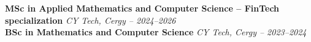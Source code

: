 \textbf{MSc in Applied Mathematics and Computer Science – FinTech specialization} \hfill \textit{CY Tech, Cergy – 2024–2026}\\
\textbf{BSc in Mathematics and Computer Science} \hfill \textit{CY Tech, Cergy – 2023–2024}
